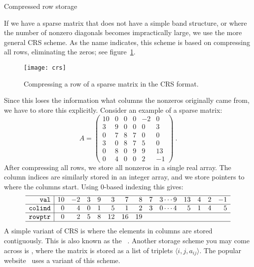
 {Compressed row storage}
\label{sec:crs}

If we have a sparse matrix that does not have a simple band structure,
or where the number of nonzero diagonals becomes impractically large,
we use the more general \acf{CRS} scheme. As the name indicates, this
scheme is based on compressing all rows, eliminating the zeros; see
figure~\ref{fig:crs}.
\begin{figure}[ht]
  \texttt{[image: crs]}
  \caption{Compressing a row of a sparse matrix in the CRS format.}
  \label{fig:crs}
\end{figure}
Since this loses the information what columns the nonzeros originally
came from, we have to store this explicitly.
Consider an example of a sparse matrix:
\begin{equation}
A =
\left(\begin{array}{rrrrrr}
      10 &  0 &  0 & 0  &-2 &  0 \\
       3 &  9 &  0 & 0  & 0 &  3 \\
       0 &  7 &  8 & 7  & 0 &  0 \\
       3 &  0 &  8 & 7  & 5 &  0 \\
       0 &  8 &  0 & 9  & 9 & 13 \\
       0 &  4 &  0 & 0  & 2 & -1
           \end{array}
\right) ~.
\end{equation}
After compressing all rows, we store all
nonzeros in a single real array. The column indices are
similarly stored in an integer array, and we store pointers to where
the columns start. Using 0-based indexing this gives:
\[
\begin{array}{r|rrrrrrrrrrrrrrr}
  \hline
\mathtt{val}     &10 &-2& 3& 9& 3& 7& 8& 7& 3 \cdots  9&13& 4& 2&-1 \\ \hline
\mathtt{colind}  & 0 & 4& 0& 1& 5& 1& 2& 3& 0 \cdots  4& 5& 1& 4& 5 \\ \hline
\mathtt{rowptr}  & 0 & 2 & 5 & 8 & 12 & 16 & 19  \\ \hline
\end{array}
\]
A simple variant of \ac{CRS} is  where the elements in columns
are stored contiguously. This is also known as the
~\cite{Duff:harwellboeingformat}.
Another storage scheme you may come across is
, where the matrix is stored as a list
of triplets $\langle i,j,a_{ij}\rangle$.
The popular 
website~\cite{matrix-market} uses a variant of this scheme.

